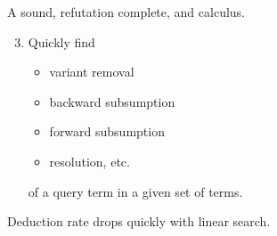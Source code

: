 

\begin{goal}
	A sound, refutation complete, and  calculus.\\[0.5em]
	\begin{enumerate}
		\setcounter{enumi}{2}
		\item Quickly find
\begin{itemize}

\item {} \hfill{\colG\footnotesize variant removal}
%

\item {}   \hfill{\colG\footnotesize backward subsumption}\\

\item {}  \hfill{\colG\footnotesize forward subsumption}\\

\item {} \hfill{\colG\footnotesize resolution, etc.}\\

\end{itemize}
of a query term in a given set of terms.
\end{enumerate}

\end{goal}


	\begin{observation}
		Deduction rate drops quickly with linear search.
	\end{observation}